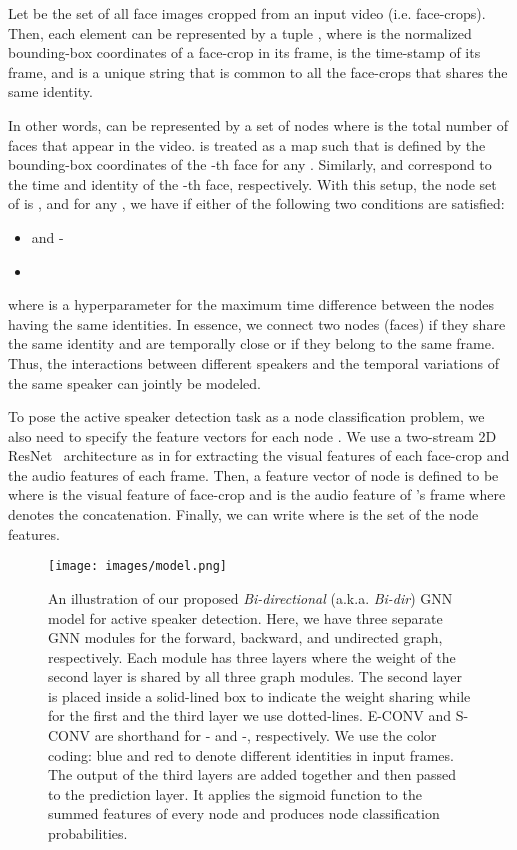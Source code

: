 \documentclass[runningheads]{llncs}
\begin{document}
Let  be the set of all face images cropped from an input video (i.e. face-crops). Then, each element  can be represented by a tuple , where  is the normalized bounding-box coordinates of a face-crop in its frame,  is the time-stamp of its frame, and  is a unique string that is common to all the face-crops that shares the same identity.

In other words,  can be represented by a set of nodes  where  is the total number of faces that appear in the video.
 is treated as a map such that  is defined by the bounding-box coordinates of the -th face for any . Similarly,  and  correspond to the time and identity of the -th face, respectively. With this setup, the node set of  is , and for any , we have  if either of the following two conditions are satisfied:

\begin{itemize}[itemindent=2.65cm]
    \setlength\itemsep{0.3em}
    \item  and -
    \item 
\end{itemize}
where  is a hyperparameter for the maximum time difference between the nodes having the same identities. In essence, we connect two nodes (faces) if they share the same identity and are temporally close or if they belong to the same frame. Thus, the interactions between different speakers and the temporal variations of the same speaker can jointly be modeled. 

To pose the active speaker detection task as a node classification problem, we also need to specify the feature vectors for each node . We use a two-stream 2D ResNet~\cite{he2016deep} architecture as in \cite{roth2020ava,alcazarActiveSpeakersContext2020} for extracting the visual features of each face-crop and the audio features of each frame. Then, a feature vector of node  is defined to be  where  is the visual feature of face-crop  and  is the audio feature of 's frame where  denotes the concatenation. Finally, we can write  where  is the set of the node features.

\begin{figure*}[t]
 \center
  \texttt{[image: images/model.png]}
  \caption{An illustration of our proposed \emph{Bi-directional} (a.k.a. \emph{Bi-dir}) GNN model for active speaker detection. Here, we have three separate GNN modules for the forward, backward, and undirected graph, respectively. Each module has three layers where the weight of the second layer is shared by all three graph modules. 
  The second layer is placed inside a solid-lined box to indicate the weight sharing while for the first and the third layer we use dotted-lines. E-CONV and S-CONV are shorthand for - and -, respectively.
We use the color coding: blue and red to denote different identities in input frames. The output of the third layers are added together and then passed to the prediction layer. It applies the sigmoid function to the summed features of every node and produces node classification probabilities.}
  \label{fig:model}
\end{figure*}
\end{document}
